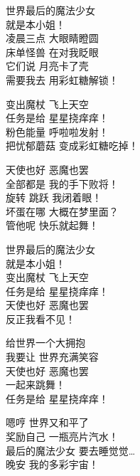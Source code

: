 \begin{song}
世界最后的魔法少女\\
就是本小姐！\\
凌晨三点 大眼睛瞪圆\\
床单怪兽 在对我眨眼\\
它们说 月亮卡了壳\\
需要我去 用彩虹糖解锁！\par
\halfline%
变出魔杖 飞上天空\\
任务是给 星星挠痒痒！\\
粉色能量 呼啦啦发射！\\
把忧郁蘑菇 变成彩虹糖吃掉！\par
\halfline%
天使也好 恶魔也罢\\
全部都是 我的手下败将！\\
旋转 跳跃 我闭着眼！\\
坏蛋在哪 大概在梦里面？\\
管他呢 快乐就起舞！\par
\halfline%
世界最后的魔法少女\\
就是本小姐！\\
变出魔杖 飞上天空\\
任务是给 星星挠痒痒！\\
天使也好 恶魔也罢\\
反正我看不见！\par
\halfline%
给世界一个大拥抱\\
我要让 世界充满笑容\\
天使也好 恶魔也罢\\
一起来跳舞！\\
任务是给 星星挠痒痒！\par
\halfline%
嗯哼 世界又和平了\\
奖励自己 一瓶亮片汽水！\\
最后的魔法少女 要去睡觉觉…\\
晚安 我的多彩宇宙！
\end{song}
